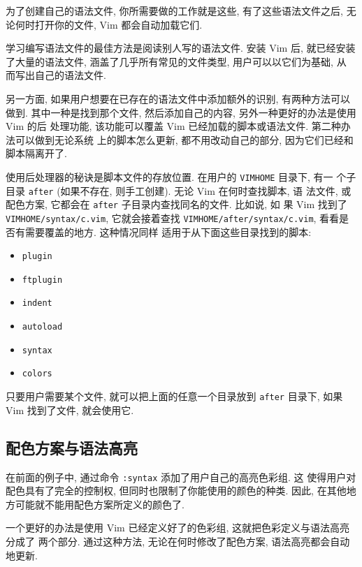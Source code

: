 为了创建自己的语法文件, 你所需要做的工作就是这些, 有了这些语法文件之后, 无
论何时打开你的文件, Vim 都会自动加载它们.

\begin{warning}
    学习编写语法文件的最佳方法是阅读别人写的语法文件. 安装 Vim 后, 就已经安装
    了大量的语法文件, 涵盖了几乎所有常见的文件类型, 用户可以以它们为基础, 从
    而写出自己的语法文件.
\end{warning}

另一方面, 如果用户想要在已存在的语法文件中添加额外的识别, 有两种方法可以做到.
其中一种是找到那个文件, 然后添加自己的内容, 另外一种更好的办法是使用 Vim 的后
处理功能, 该功能可以覆盖 Vim 已经加载的脚本或语法文件. 第二种办法可以做到无论系统
上的脚本怎么更新, 都不用改动自己的部分, 因为它们已经和脚本隔离开了.

使用后处理器的秘诀是脚本文件的存放位置. 在用户的 \texttt{VIMHOME} 目录下, 有一
个子目录 \texttt{after} (如果不存在, 则手工创建). 无论 Vim 在何时查找脚本, 语
法文件, 或配色方案, 它都会在 \texttt{after} 子目录内查找同名的文件. 比如说, 如
果 Vim 找到了 \texttt{VIMHOME/syntax/c.vim}, 它就会接着查找
\texttt{VIMHOME/after/syntax/c.vim}, 看看是否有需要覆盖的地方. 这种情况同样
适用于从下面这些目录找到的脚本:
\begin{itemize}
    \item \texttt{plugin}
    \item \texttt{ftplugin}
    \item \texttt{indent}
    \item \texttt{autoload}
    \item \texttt{syntax}
    \item \texttt{colors}
\end{itemize}
只要用户需要某个文件, 就可以把上面的任意一个目录放到 \texttt{after} 目录下,
如果 Vim 找到了文件, 就会使用它.

\subsection{配色方案与语法高亮}
\label{subsec:color_scheme_and_syntax_coloring}

在前面的例子中, 通过命令 \texttt{:syntax} 添加了用户自己的高亮色彩组. 这
使得用户对配色具有了完全的控制权, 但同时也限制了你能使用的颜色的种类.
因此, 在其他地方可能就不能用配色方案所定义的颜色了.

一个更好的办法是使用 Vim 已经定义好了的色彩组, 这就把色彩定义与语法高亮分成了
两个部分. 通过这种方法, 无论在何时修改了配色方案, 语法高亮都会自动地更新.

